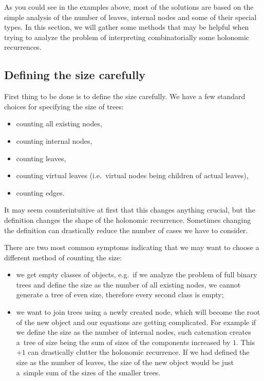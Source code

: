 \documentclass[final]{article}
\theoremstyle{definition}
\theoremstyle{definition}
\theoremstyle{remark}
\begin{document}
As you could see in the examples above, most of the solutions are based on the simple analysis of the number of leaves, internal nodes and some of their special types. In this section, we will gather some methods that may be helpful when trying to analyze the problem of interpreting combinatorially some holonomic recurrences.

\subsection{Defining the size carefully}%
\label{sub:defining_the_size_carefully}

First thing to be done is to define the size carefully. We have a few standard choices for specifying the size of trees:
\begin{itemize}
    \item counting all existing nodes,
    \item counting internal nodes,
    \item counting leaves,
    \item counting virtual leaves (i.e.~virtual nodes being children of actual leaves),
    \item counting edges.
\end{itemize}

It may seem counterintuitive at first that this changes anything crucial, but the definition changes the shape of the holonomic recurrence. Sometimes changing the definition can drastically reduce the number of cases we have to consider.

There are two most common symptoms indicating that we may want to choose a different method of counting the size:
\begin{itemize}
    \item we get empty classes of objects, e.g.~if we analyze the problem of full binary trees and define the size as the number of all existing nodes, we cannot generate a tree of even size, therefore every second class is empty;
    \item we want to join trees using a newly created node, which will become the root of the new object and our equations are getting complicated. For example if we define the size as the number of internal nodes, such catenation creates a~tree of size being the sum of sizes of the components increased by \(1\). This \(+1\) can drastically clutter the holonomic recurrence. If we had defined the size as the number of leaves, the size of the new object would be just a~simple sum of the sizes of the smaller trees.
\end{itemize}
\end{document}
